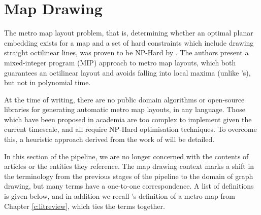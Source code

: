 \clearpage
\section{Map Drawing} \label{sec:drawing}

The metro map layout problem, that is, determining whether an optimal planar embedding exists for a map and a set of hard constraints which include drawing straight octilinear lines, was proven to be NP-Hard by \cite{AutomatedDrawingOfMetroMaps}. The authors present a mixed-integer program (MIP) approach to metro map layouts, which both guarantees an octilinear layout and avoids falling into local maxima (unlike \citeauthor{AutomaticMetroMapLayoutThesis}'s), but not in polynomial time.

At the time of writing, there are no public domain algorithms or open-source libraries for generating automatic metro map layouts, in any language. Those which have been proposed in academia \citep{AutomaticMetroMapLayoutThesis, AutomatedDrawingOfMetroMaps} are too complex to implement given the current timescale, and all require NP-Hard optimisation techniques. To overcome this, a heuristic approach derived from the work of \citep{AutomaticMetroMapLayoutThesis, AutomaticMetroMapLayout, WhichAesthetic} will be detailed.

In this section of the pipeline, we are no longer concerned with the contents of articles or the entities they reference. The map drawing context marks a shift in the terminology from the previous stages of the pipeline to the domain of graph drawing, but many terms have a one-to-one correspondence. A list of definitions is given below, and in addition we recall \citeauthor{GeneratingInformationMaps}'s definition of a metro map from Chapter \ref{c:litreview}, which ties the terms together.

